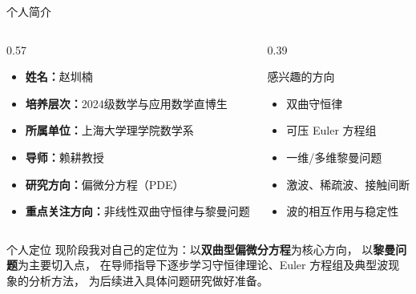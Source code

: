 \documentclass{beamer}
\begin{document}
\begin{frame}{个人简介}
\small

\begin{columns}[T,totalwidth=\textwidth]
    \begin{column}{0.57\textwidth}
        {\setlength{\itemsep}{0.45em}
        \begin{itemize}
            \item \textbf{姓名：}赵圳楠
            \item \textbf{培养层次：}2024级数学与应用数学直博生
            \item \textbf{所属单位：}上海大学理学院数学系
            \item \textbf{导师：}赖耕教授
            \item \textbf{研究方向：}偏微分方程（PDE）
            \item \textbf{重点关注方向：}非线性双曲守恒律与黎曼问题
        \end{itemize}
        }
    \end{column}


    \begin{column}{0.39\textwidth}
        \begin{block}{感兴趣的方向}
            {\setlength{\itemsep}{0.40em}
            \begin{itemize}
                \item 双曲守恒律
                \item 可压 Euler 方程组
                \item 一维/多维黎曼问题
                \item 激波、稀疏波、接触间断
                \item 波的相互作用与稳定性
            \end{itemize}
            }
        \end{block}
    \end{column}
\end{columns}

\vspace{0.35em}

\begin{block}{个人定位}
现阶段我对自己的定位为：以\textbf{双曲型偏微分方程}为核心方向，
以\textbf{黎曼问题}为主要切入点，
在导师指导下逐步学习守恒律理论、Euler 方程组及典型波现象的分析方法，
为后续进入具体问题研究做好准备。
\end{block}

\end{frame}
\end{document}
